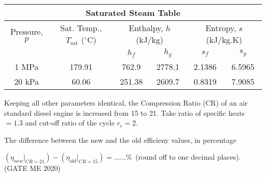 \begin{table}[h!]
    \centering
    \begin{tabular}{|c|c|c|c|c|c|}
        \hline
        \multicolumn{6}{|c|}{Saturated Steam Table} \\
        \hline
        Pressure, $p$ & Sat. Temp., $T_\text{sat}$ ($^\circ$C) & \multicolumn{2}{|c|}{ Enthalpy, $h$ (kJ/kg)} & \multicolumn{2}{|c|}{Entropy, $s$ (kJ/kg.K)} \\
        \cline{3-6}
        & & $h_f$ & $h_g$ & $s_f$ & $s_g$ \\
        \hline
        1 MPa & 179.91 & 762.9 & 2778.1 & 2.1386 & 6.5965 \\
        20 kPa & 60.06 & 251.38 & 2609.7 & 0.8319 & 7.9085 \\
        \hline
    \end{tabular}
\end{table}


\item Keeping all other parameters identical, the Compression Ratio (CR) of an air standard diesel engine is increased from 15 to 21. Take ratio of specific heats $= 1.3$ and cut-off ratio of the cycle $r_c = 2$.

The difference between the new and the old efficieny values, in percentage 

$(\eta_{new}|_{CR=21}) - (\eta_{old}|_{CR=15}) = \ldots\ldots \%$\ (round off to one decimal places). \hfill (GATE ME 2020)
